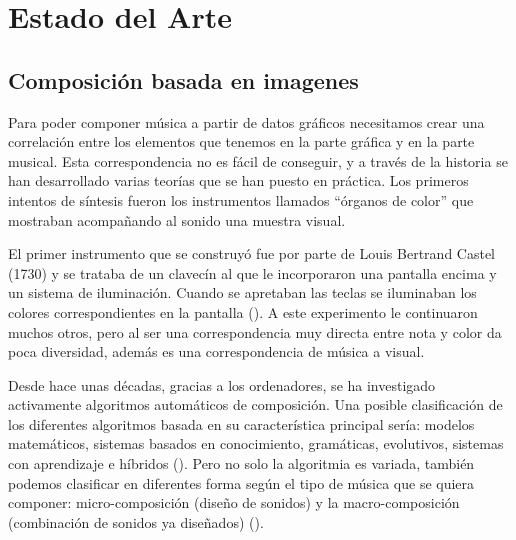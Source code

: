 \section{Estado del Arte}
\label{sec:estadodelarte}



\subsection{Composición basada en imagenes}


Para poder componer música a partir de datos gráficos necesitamos crear una correlación entre los elementos que tenemos en la parte gráfica y en la parte musical. Esta correspondencia no es fácil de conseguir, y a través de la historia se han desarrollado varias teorías que se han puesto en práctica. Los primeros intentos de síntesis fueron los instrumentos llamados ``órganos de color'' que mostraban acompañando al sonido una muestra visual.

El primer instrumento que se construyó fue por parte de Louis Bertrand Castel (1730) y se trataba de un clavecín al que le incorporaron una pantalla encima y un sistema de iluminación. Cuando se apretaban las teclas se iluminaban los colores correspondientes en la pantalla (\cite{organosColor}). A este experimento le continuaron muchos otros, pero al ser una correspondencia muy directa entre nota y color da poca diversidad, además es una correspondencia de música a visual.

Desde hace unas décadas, gracias a los ordenadores, se ha investigado activamente algoritmos automáticos de composición. Una posible clasificación de los diferentes algoritmos basada en su característica principal sería: modelos matemáticos, sistemas basados en conocimiento, gramáticas, evolutivos, sistemas con aprendizaje e híbridos (\cite{AIMethodsForComposition}). Pero no solo la algoritmia es variada, también podemos clasificar en diferentes forma según el tipo de música que se quiera componer: micro-composición (diseño de sonidos) y la macro-composición (combinación de sonidos ya diseñados) (\cite{AudioVisualSurvey}).

